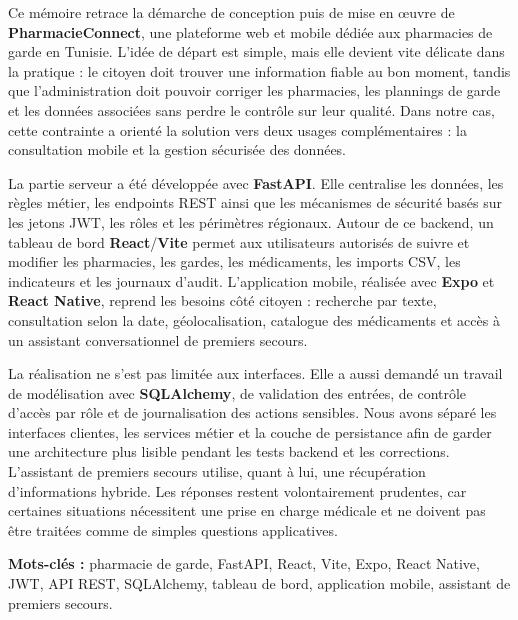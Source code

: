 Ce mémoire retrace la démarche de conception puis de mise en œuvre de \textbf{PharmacieConnect}, une
plateforme web et mobile dédiée aux pharmacies de garde en Tunisie. L'idée de départ est simple, mais elle
devient vite délicate dans la pratique : le citoyen doit trouver une information fiable au bon moment, tandis
que l'administration doit pouvoir corriger les pharmacies, les plannings de garde et les données associées
sans perdre le contrôle sur leur qualité. Dans notre cas, cette contrainte a orienté la solution vers deux
usages complémentaires : la consultation mobile et la gestion sécurisée des données.

La partie serveur a été développée avec \textbf{FastAPI}. Elle centralise les données, les règles métier, les
endpoints REST ainsi que les mécanismes de sécurité basés sur les jetons JWT, les rôles et les périmètres
régionaux. Autour de ce backend, un tableau de bord \textbf{React}/\textbf{Vite} permet aux utilisateurs
autorisés de suivre et modifier les pharmacies, les gardes, les médicaments, les imports CSV, les indicateurs
et les journaux d'audit. L'application mobile, réalisée avec \textbf{Expo} et \textbf{React Native}, reprend
les besoins côté citoyen : recherche par texte, consultation selon la date, géolocalisation, catalogue des
médicaments et accès à un assistant conversationnel de premiers secours.

La réalisation ne s'est pas limitée aux interfaces. Elle a aussi demandé un travail de modélisation avec
\textbf{SQLAlchemy}, de validation des entrées, de contrôle d'accès par rôle et de journalisation des actions
sensibles. Nous avons séparé les interfaces clientes, les services métier et la couche de persistance afin de
garder une architecture plus lisible pendant les tests backend et les corrections. L'assistant de premiers
secours utilise, quant à lui, une récupération d'informations hybride. Les réponses restent volontairement
prudentes, car certaines situations nécessitent une prise en charge médicale et ne doivent pas être traitées
comme de simples questions applicatives.

\textbf{Mots-clés :} pharmacie de garde, FastAPI, React, Vite, Expo, React Native, JWT, API REST,
SQLAlchemy, tableau de bord, application mobile, assistant de premiers secours.
